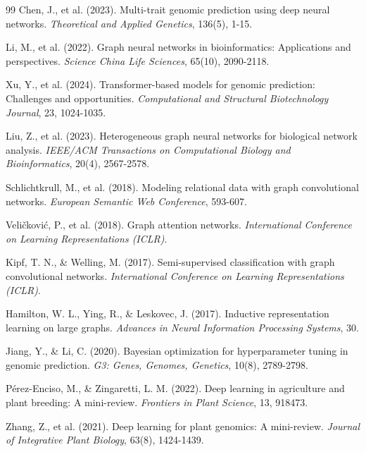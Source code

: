 \documentclass[11pt,a4paper]{article}
\begin{document}
\begin{thebibliography}{99}
Chen, J., et al. (2023).
Multi-trait genomic prediction using deep neural networks.
\textit{Theoretical and Applied Genetics}, 136(5), 1-15.

Li, M., et al. (2022).
Graph neural networks in bioinformatics: Applications and perspectives.
\textit{Science China Life Sciences}, 65(10), 2090-2118.

Xu, Y., et al. (2024).
Transformer-based models for genomic prediction: Challenges and opportunities.
\textit{Computational and Structural Biotechnology Journal}, 23, 1024-1035.

Liu, Z., et al. (2023).
Heterogeneous graph neural networks for biological network analysis.
\textit{IEEE/ACM Transactions on Computational Biology and Bioinformatics}, 20(4), 2567-2578.

Schlichtkrull, M., et al. (2018).
Modeling relational data with graph convolutional networks.
\textit{European Semantic Web Conference}, 593-607.

Veli\v{c}kovi\'{c}, P., et al. (2018).
Graph attention networks.
\textit{International Conference on Learning Representations (ICLR)}.

Kipf, T. N., \& Welling, M. (2017).
Semi-supervised classification with graph convolutional networks.
\textit{International Conference on Learning Representations (ICLR)}.

Hamilton, W. L., Ying, R., \& Leskovec, J. (2017).
Inductive representation learning on large graphs.
\textit{Advances in Neural Information Processing Systems}, 30.

Jiang, Y., \& Li, C. (2020).
Bayesian optimization for hyperparameter tuning in genomic prediction.
\textit{G3: Genes, Genomes, Genetics}, 10(8), 2789-2798.

P\'{e}rez-Enciso, M., \& Zingaretti, L. M. (2022).
Deep learning in agriculture and plant breeding: A mini-review.
\textit{Frontiers in Plant Science}, 13, 918473.

Zhang, Z., et al. (2021).
Deep learning for plant genomics: A mini-review.
\textit{Journal of Integrative Plant Biology}, 63(8), 1424-1439.


\end{thebibliography}
\end{document}
